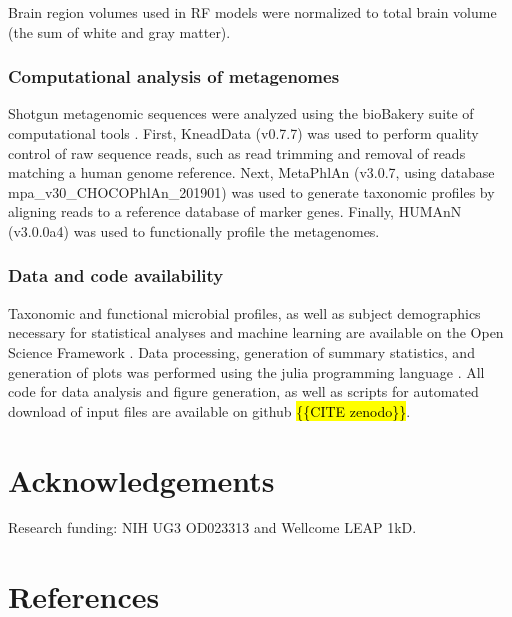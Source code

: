 \documentclass{article}
\begin{document}
Brain region volumes used in RF models were normalized to total brain volume
(the sum of white and gray matter).

\subsubsection*{Computational analysis of metagenomes}

Shotgun metagenomic sequences were analyzed using the bioBakery suite of
computational tools \cite{beghiniIntegratingTaxonomicFunctional2021}.
First, KneadData (v0.7.7) was used to perform quality
control of raw sequence reads, such as read trimming and removal of
reads matching a human genome reference. Next, MetaPhlAn (v3.0.7, using
database mpa\_v30\_CHOCOPhlAn\_201901) was used to generate taxonomic
profiles by aligning reads to a reference database of marker genes.
Finally, HUMAnN (v3.0.0a4) was used to functionally profile the
metagenomes.

\subsubsection*{Data and code availability}

Taxonomic and functional microbial profiles, as well as subject
demographics necessary for statistical analyses and machine learning are
available on the Open Science Framework
\cite{bonhamECHORESONANCEMicrobiome2022}.
 Data processing, generation of summary statistics, and
generation of plots was performed using the julia programming language
\cite{bezansonJuliaFreshApproach2017,bonhamMicrobiomeJlBiobakeryUtils2021,danischMakieJlFlexible2021}.
 All code for
data analysis and figure generation, as well as scripts for automated
download of input files are available on github \hl{\{\{CITE zenodo\}\}}.

\section*{Acknowledgements}

Research funding: NIH UG3 OD023313 and Wellcome LEAP 1kD.

\section*{References}

\printbibliography
\end{document}
